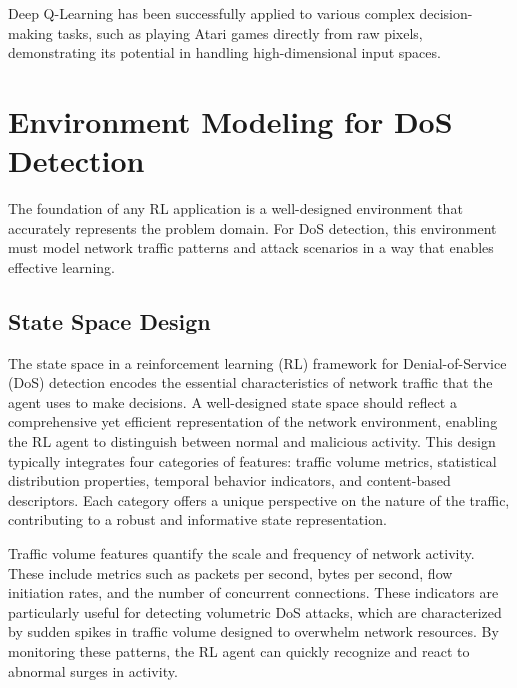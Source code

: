 \documentclass[16pt]{report}
\begin{document}
Deep Q-Learning has been successfully applied to various complex decision-making tasks, such as playing Atari games directly from raw pixels, demonstrating its potential in handling high-dimensional input spaces.



\section{Environment Modeling for DoS Detection}

The foundation of any RL application is a well-designed environment that accurately represents the problem domain. For DoS detection, this environment must model network traffic patterns and attack scenarios in a way that enables effective learning.

\subsection{State Space Design}

The state space in a reinforcement learning (RL) framework for Denial-of-Service (DoS) detection encodes the essential characteristics of network traffic that the agent uses to make decisions. A well-designed state space should reflect a comprehensive yet efficient representation of the network environment, enabling the RL agent to distinguish between normal and malicious activity. This design typically integrates four categories of features: traffic volume metrics, statistical distribution properties, temporal behavior indicators, and content-based descriptors. Each category offers a unique perspective on the nature of the traffic, contributing to a robust and informative state representation.

Traffic volume features quantify the scale and frequency of network activity. These include metrics such as packets per second, bytes per second, flow initiation rates, and the number of concurrent connections. These indicators are particularly useful for detecting volumetric DoS attacks, which are characterized by sudden spikes in traffic volume designed to overwhelm network resources. By monitoring these patterns, the RL agent can quickly recognize and react to abnormal surges in activity.
\end{document}
